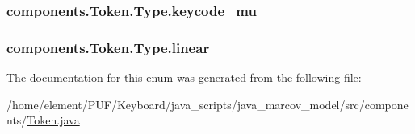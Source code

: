 \subsubsection[{\texorpdfstring{keycode\+\_\+mu}{keycode_mu}}]{\setlength{\rightskip}{0pt plus 5cm}components.\+Token.\+Type.\+keycode\+\_\+mu}\hypertarget{enumcomponents_1_1_token_1_1_type_a87c6d7380a042991b552b6b4fb33acdf}{}\label{enumcomponents_1_1_token_1_1_type_a87c6d7380a042991b552b6b4fb33acdf}
\subsubsection[{\texorpdfstring{linear}{linear}}]{\setlength{\rightskip}{0pt plus 5cm}components.\+Token.\+Type.\+linear}\hypertarget{enumcomponents_1_1_token_1_1_type_ac32881b7c310d3276351f4209e598e3a}{}\label{enumcomponents_1_1_token_1_1_type_ac32881b7c310d3276351f4209e598e3a}


The documentation for this enum was generated from the following file\+:\begin{DoxyCompactItemize}
\item 
/home/element/\+P\+U\+F/\+Keyboard/java\+\_\+scripts/java\+\_\+marcov\+\_\+model/src/components/\hyperlink{_token_8java}{Token.\+java}\end{DoxyCompactItemize}
